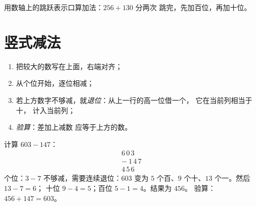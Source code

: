\begin{omfigure}

{\small 用数轴上的跳跃表示口算加法：$256 + 130$ 分两次
跳完，先加百位，再加十位。}
\end{omfigure}

\section{竖式减法}

\begin{method}[竖式减法]\label{met:g3:addsub:sub}
\begin{enumerate}
  \item 把较大的数写在上面，右端对齐；
  \item 从个位开始，逐位相减；
  \item 若上方数字不够减，就\emph{退位}：从上一行的高一位借一个，
        它在当前列相当于十，
        计入当前列；
  \item \emph{验算}：差加上减数
        应等于上方的数。
\end{enumerate}
\end{method}

\begin{example}\label{ex:g3:addsub:sub}
计算 $603 - 147$：
\[
\begin{array}{r}
6\,0\,3 \\
-\ 1\,4\,7 \\
\hline
4\,5\,6
\end{array}
\]
个位：$3 - 7$ 不够减，需要连续退位：$603$ 变为
$5$ 个百、$9$ 个十、$13$ 个一。然后 $13 - 7 = 6$；
十位 $9 - 4 = 5$；百位 $5 - 1 = 4$。结果为 $456$。
验算：$456 + 147 = 603$。
\end{example}

